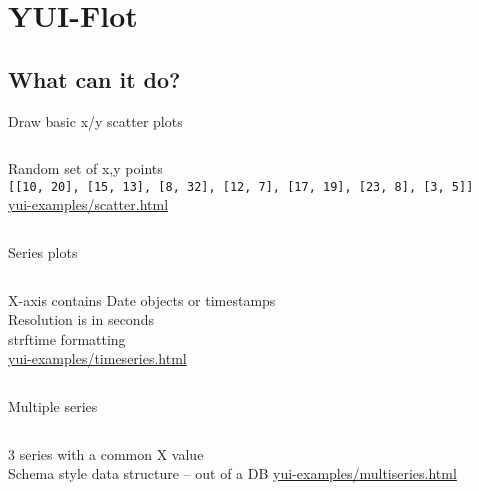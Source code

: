 \documentclass{beamer}
\begin{document}
\section{YUI-Flot}
\subsection{What can it do?}

\begin{frame}{Draw basic x/y scatter plots}
  \begin{columns}[c]
    \begin{block}{}
      \small{Random set of x,y points} \\
      \texttt{\tiny{[[10, 20], [15, 13], [8, 32], [12, 7], [17, 19], [23, 8], [3, 5]]}} \\
      \href{http://bluesmoon.github.com/yui-flot/yui-examples/scatter.html}{\small{yui-examples/scatter.html}} \\
    \end{block}
  \end{columns}
\end{frame}

\begin{frame}{Series plots}
  \begin{columns}[c]
    \begin{block}{}
      \small{X-axis contains Date objects or timestamps} \\
      \small{Resolution is in seconds} \\
      \small{strftime formatting} \\
      \href{http://bluesmoon.github.com/yui-flot/yui-examples/timeseries.html}{\small{yui-examples/timeseries.html}} \\
    \end{block}
  \end{columns}
\end{frame}

\begin{frame}{Multiple series}
  \begin{columns}[c]
    \begin{block}{}
      \small{3 series with a common X value} \\
      \small{Schema style data structure -- out of a DB}
      \href{http://bluesmoon.github.com/yui-flot/yui-examples/multiseries.html}{\small{yui-examples/multiseries.html}} \\
    \end{block}
  \end{columns}
\end{frame}
\end{document}
